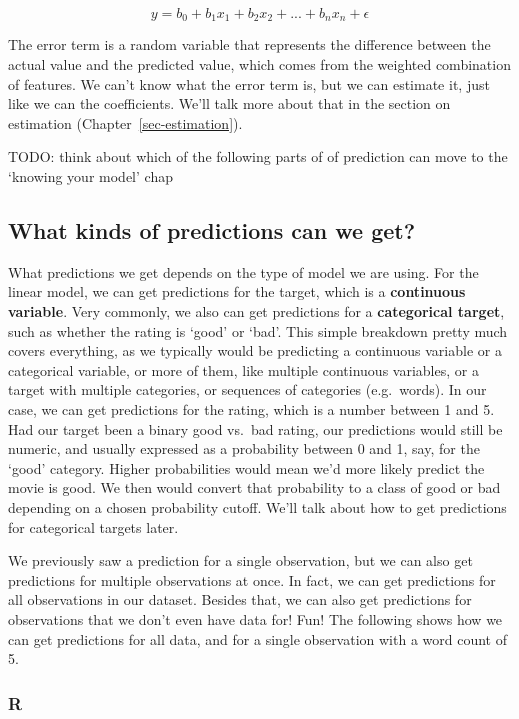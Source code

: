 \documentclass[
  letterpaper,
]{krantz}
\begin{document}
\[
y = b_0 + b_1x_1 + b_2x_2 + ... + b_nx_n + \epsilon
\]

The error term is a random variable that represents the difference
between the actual value and the predicted value, which comes from the
weighted combination of features. We can't know what the error term is,
but we can estimate it, just like we can the coefficients. We'll talk
more about that in the section on estimation
(Chapter~\ref{sec-estimation}).

TODO: think about which of the following parts of of prediction can move
to the `knowing your model' chap

\subsection{What kinds of predictions can we
get?}\label{sec-lm-prediction-types}

What predictions we get depends on the type of model we are using. For
the linear model, we can get predictions for the target, which is a
\textbf{continuous variable}. Very commonly, we also can get predictions
for a \textbf{categorical target}, such as whether the rating is `good'
or `bad'. This simple breakdown pretty much covers everything, as we
typically would be predicting a continuous variable or a categorical
variable, or more of them, like multiple continuous variables, or a
target with multiple categories, or sequences of categories
(e.g.~words). In our case, we can get predictions for the rating, which
is a number between 1 and 5. Had our target been a binary good vs.~bad
rating, our predictions would still be numeric, and usually expressed as
a probability between 0 and 1, say, for the `good' category. Higher
probabilities would mean we'd more likely predict the movie is good. We
then would convert that probability to a class of good or bad depending
on a chosen probability cutoff. We'll talk about how to get predictions
for categorical targets later.

We previously saw a prediction for a single observation, but we can also
get predictions for multiple observations at once. In fact, we can get
predictions for all observations in our dataset. Besides that, we can
also get predictions for observations that we don't even have data for!
Fun! The following shows how we can get predictions for all data, and
for a single observation with a word count of 5.

\subsubsection{R}
\end{document}
